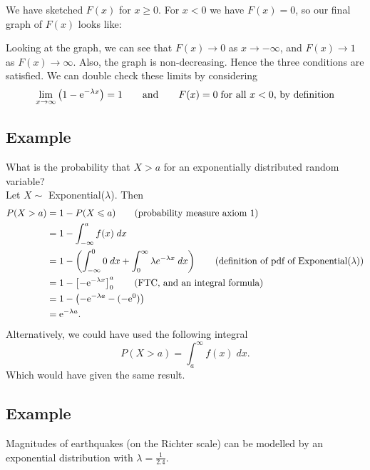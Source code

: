 We have sketched $F(x)$ for $x \geq 0$. For $x < 0$ we have $F(x) = 0$, so our final graph of $F(x)$ looks like:
\begin{center}
\end{center}
Looking at the graph, we can see that $F(x) \rightarrow 0$ as $x \rightarrow -\infty$, and $F(x) \rightarrow 1$ as $F(x) \rightarrow \infty$. Also, the graph is non-decreasing. Hence the three conditions are satisfied. We can double check these limits by considering
\[
\lim_{x \rightarrow \infty} \left(1-\mathrm{e}^{-\lambda x}\right) = 1 \qquad \text{and} \qquad F(x) = 0 \; \text{for all $x < 0$, by definition}
\]

\subsection{Example} \label{ex17.1}
What is the probability that $X > a$ for an exponentially distributed random variable? \\

\solution
Let $X \sim$ Exponential($\lambda$). Then
\begin{align*}
P(X > a) & = 1 - P(X \leqslant a) \tag{probability measure axiom 1} \\
	      & = 1 - \int_{-\infty}^a f(x) \; dx \\
	      & = 1 - \left(\int_{-\infty}^0 0 \; dx + \int_0^\infty \lambda e^{-\lambda x} \; dx\right) \tag{definition of pdf of Exponential($\lambda$)} \\
	      & = 1 - \left[-\mathrm{e}^{-\lambda x}\right]_0^a \tag{FTC, and an integral formula} \\
	      & = 1 - \left(-\mathrm{e}^{-\lambda a} - (-\mathrm{e}^0)\right) \\
	      & = \mathrm{e}^{-\lambda a}.
\end{align*}
Alternatively, we could have used the following integral
\[
P(X > a) = \int_a^\infty f(x) \; dx.
\]
Which would have given the same result.

\subsection{Example}
Magnitudes of earthquakes (on the Richter scale) can be modelled by an exponential distribution with $\lambda = \frac{1}{2.4}$. \\

